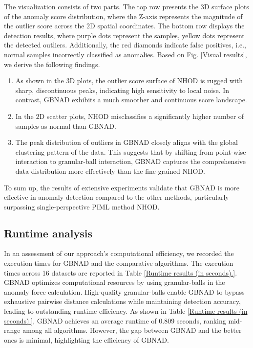 \documentclass[times, review, 10pt]{elsarticle}
\begin{document}
{The visualization consists of two parts. The top row presents the 3D surface plots of the anomaly score distribution, where the Z-axis represents the magnitude of the outlier score across the 2D spatial coordinates. The bottom row displays the detection results, where purple dots represent the samples, yellow dots represent the detected outliers. Additionally, the red diamonds indicate false positives, i.e., normal samples incorrectly classified as anomalies.}
Based on Fig. \ref{Visual results}, we derive the following findings.
\begin{enumerate}[\indent(1)]
    \item As shown in the 3D plots, the outlier score surface of NHOD is rugged with sharp, discontinuous peaks, indicating high sensitivity to local noise. In contrast, GBNAD exhibits a much smoother and continuous score landscape. 
    
    \item In the 2D scatter plots, NHOD misclassifies a significantly higher number of samples as normal than GBNAD.
    
    \item The peak distribution of outliers in GBNAD closely aligns with the global clustering pattern of the data. This suggests that by shifting from point-wise interaction to granular-ball interaction, GBNAD captures the comprehensive data distribution more effectively than the fine-grained NHOD.
\end{enumerate}

To sum up, the results of extensive experiments validate that GBNAD is more effective in anomaly detection compared to the other methods, particularly surpassing single-perspective PIML method NHOD.




\subsection{Runtime analysis}
{In an assessment of our approach's computational efficiency, we recorded the execution times for GBNAD and the comparative algorithms.} The execution times across 16 datasets are reported in Table \ref{Runtime results (in seconds).}. GBNAD optimizes computational resources by using granular-balls in the anomaly force calculation. High-quality granular-balls enable GBNAD to bypass exhaustive pairwise distance calculations while maintaining detection accuracy, leading to outstanding runtime efficiency. As shown in Table \ref{Runtime results (in seconds).}, GBNAD achieves an average runtime of 0.809 seconds, ranking mid-range among all algorithms. However, the gap between GBNAD and the better ones is minimal, highlighting the efficiency of GBNAD.
\end{document}
